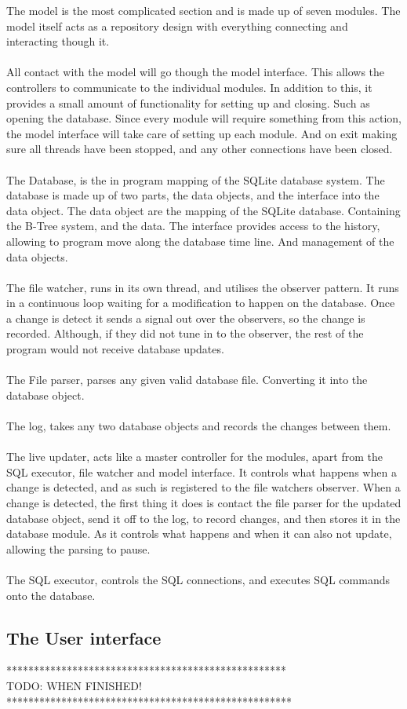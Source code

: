 The model is the most complicated section and is made up of seven modules. The model itself acts as a repository design with everything connecting and interacting though it.
\\\\
All contact with the model will go though the model interface. This allows the controllers to communicate to the individual modules. In addition to this, it provides a small amount of functionality for setting up and closing. Such as opening the database. Since every module will require something from this action, the model interface will take care of setting up each module. And on exit making sure all threads have been stopped, and any other connections have been closed.
\\\\
The Database, is the in program mapping of the SQLite database system. The database is made up of two parts, the data objects, and the interface into the data object. The data object are the mapping of the SQLite database. Containing the B-Tree system, and the data. The interface provides access to the history, allowing to program move along the database time line. And management of the data objects.
\\\\
The file watcher, runs in its own thread, and utilises the observer pattern. It runs in a continuous loop waiting for a modification to happen on the database. Once a change is detect it sends a signal out over the observers, so the change is recorded. Although, if they did not tune in to the observer, the rest of the program would not receive database updates.
\\\\
The File parser, parses any given valid database file. Converting it into the database object.
\\\\
The log, takes any two database objects and records the changes between them.
\\\\
The live updater, acts like a master controller for the modules, apart from the SQL executor, file watcher and model interface. It controls what happens when a change is detected, and as such is registered to the file watchers observer. When a change is detected, the first thing it does is contact the file parser for the updated database object, send it off to the log, to record changes, and then stores it in the database module. As it controls what happens and when it can also not update, allowing the parsing to pause.
\\\\
The SQL executor, controls the SQL connections, and executes SQL commands onto the database.

\subsection{The User interface}
\label{subsec:high_user_interface}
***************************************************\\
TODO: WHEN FINISHED!\\
****************************************************